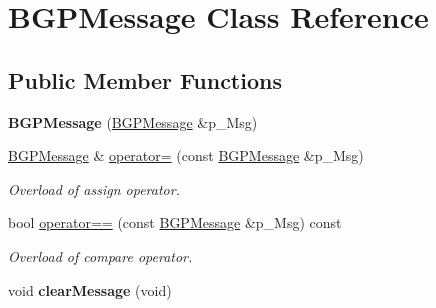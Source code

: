 \hypertarget{classBGPMessage}{\section{B\-G\-P\-Message Class Reference}
\label{classBGPMessage}
}
\subsection*{Public Member Functions}
\begin{DoxyCompactItemize}
\item 
\hypertarget{classBGPMessage_adc6bbac9250b1d246111183f8322f25f}{{\bfseries B\-G\-P\-Message} (\hyperlink{classBGPMessage}{B\-G\-P\-Message} \&p\-\_\-\-Msg)}\label{classBGPMessage_adc6bbac9250b1d246111183f8322f25f}

\item 
\hyperlink{classBGPMessage}{B\-G\-P\-Message} \& \hyperlink{classBGPMessage_ac24ad07e2e991aa00aca3b60ed15b869}{operator=} (const \hyperlink{classBGPMessage}{B\-G\-P\-Message} \&p\-\_\-\-Msg)
\begin{DoxyCompactList}\small\item\em Overload of assign operator. \end{DoxyCompactList}\item 
bool \hyperlink{classBGPMessage_a0bb89ae6df629fd0718ddd08453c1b61}{operator==} (const \hyperlink{classBGPMessage}{B\-G\-P\-Message} \&p\-\_\-\-Msg) const 
\begin{DoxyCompactList}\small\item\em Overload of compare operator. \end{DoxyCompactList}\item 
\hypertarget{classBGPMessage_a36db34985c63befc284448f562bab316}{void {\bfseries clear\-Message} (void)}\label{classBGPMessage_a36db34985c63befc284448f562bab316}

\end{DoxyCompactItemize}

